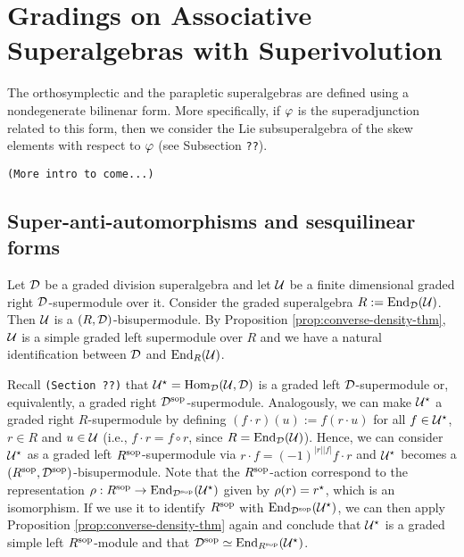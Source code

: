 \documentclass{amsbook}
\begin{document}
\chapter{Gradings on Associative Superalgebras with Superivolution}

The orthosymplectic and the parapletic superalgebras are defined using a nondegenerate bilinenar form. 
More specifically, if $\varphi$ is the superadjunction related to this form, then we consider the Lie subsuperalgebra of the skew elements with respect to $\varphi$ (see Subsection {\tt ??}). 

\vspace{5mm}
{\tt (More intro to come...)}



\section{Super-anti-automorphisms and sesquilinear forms}

Let $\mathcal{D}$ be a graded division superalgebra and let $\mathcal U$ be a finite dimensional graded right $\mathcal{D}$-supermodule over it. Consider the graded superalgebra $R := \operatorname{End}_{\mathcal{D}}(\mathcal U)$. Then $\mathcal U$ is a $(R, \mathcal{D})$-bisupermodule. By Proposition \ref{prop:converse-density-thm}, $\mathcal U$ is a simple graded left supermodule over $R$ and we have a natural identification between $\mathcal{D}$ and $\operatorname{End}_R(\mathcal U)$.

Recall {\tt (Section ??)} that $\mathcal U^\star = \operatorname{Hom}_{\mathcal{D}} (\mathcal U, \mathcal{D})$ is a graded left $\mathcal{D}$-supermodule or, equivalently, a graded right $\mathcal{D}^{\mathrm{sop}}$-supermodule. Analogously, we can make $\mathcal U^\star$ a graded right $R$-supermodule by defining $(f\cdot r) (u) := f(r\cdot u)$ for all $f\in \mathcal U^\star$, $r\in R$ and $u\in \mathcal U$ (i.e., $f\cdot r = f \circ r$, since $R = \operatorname{End}_{\mathcal{D}}(\mathcal U)$). Hence, we can consider $\mathcal U^\star$ as a graded left $R^{\mathrm{sop}}$-supermodule via $r\cdot f = (-1)^{|r||f|} f\cdot r$ %
and $\mathcal U^\star$ becomes a $(R^{\mathrm{sop}}, \mathcal{D}^{\mathrm{sop}})$-bisupermodule.
Note that the $R^{\mathrm{sop}}$-action correspond to the representation $\rho: R^{\mathrm{sop}} \to \operatorname{End}_{\mathcal{D}^{\mathrm{sop}}} (\mathcal U^\star)$ given by $ \rho(r) = r^\star$, which is an isomorphism.
If we use it to identify $R^{\mathrm{sop}}$ with $\operatorname{End}_{\mathcal{D}^{\mathrm{sop}}} (\mathcal U^\star)$, we can then apply Proposition \ref{prop:converse-density-thm} again and conclude that $\mathcal U^\star$ is a graded simple left $R^{\mathrm{sop}}$-module and that $\mathcal{D}^{\mathrm{sop}} \simeq \operatorname{End}_{R^{\mathrm{sop}}}(\mathcal U^\star)$.
\end{document}

